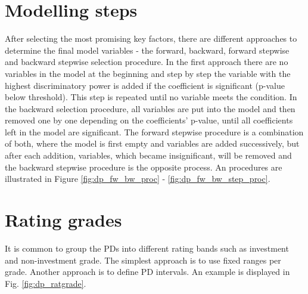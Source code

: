 \section{Modelling steps}
After selecting the most promising key factors, there are different approaches to determine the final model variables - the forward, backward, forward stepwise and backward stepwise selection procedure. In the first approach there are no variables in the model at the beginning and step by step the variable with the highest discriminatory power is added if the coefficient is significant (p-value below threshold). This step is repeated until no variable meets the condition. In the backward selection procedure, all variables are put into the model and then removed one by one depending on the coefficients' p-value, until all coefficients left in the model are significant. The forward stepwise procedure is a combination of both, where the model is first empty and variables are added successively, but after each addition, variables, which became insignificant, will be removed and the backward stepwise procedure is the opposite process. An procedures are illustrated in Figure \ref{fig:dp_fw_bw_proc} - \ref{fig:dp_fw_bw_step_proc}.

\section{Rating grades}
It is common to group the PDs into different rating bands such as investment and non-investment grade. The simplest approach is to use fixed ranges per grade. Another approach is to define PD intervals. An example is displayed in Fig. \ref{fig:dp_ratgrade}.